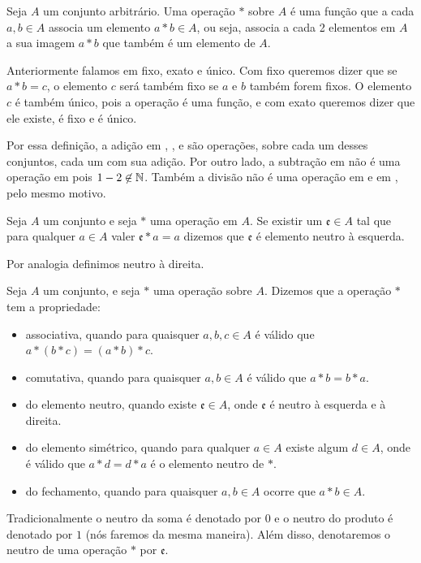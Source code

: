 \documentclass[../main.tex]{subfiles}
\begin{document}
\begin{defi}\label{agb-def-operacao}
    Seja $A$ um conjunto arbitrário. Uma operação $*$ sobre $A$ é uma função que a cada $a,b \in A$ associa um elemento $a * b \in A$, ou seja, associa a cada 2 elementos em $A$ a sua imagem $a * b$ que também é um elemento de $A$.
\end{defi}

\begin{obs}\label{agb-obs-operacao}
    Anteriormente falamos em fixo, exato e único. Com fixo queremos dizer que se $a*b = c$, o elemento $c$ será também fixo se $a$ e $b$ também forem fixos. O elemento $c$ é também único, pois a operação é uma função, e com exato queremos dizer que ele existe, é fixo e é único. 
\end{obs}

Por essa definição, a adição em \N, \Z, \Q e \R são operações, sobre cada um desses conjuntos, cada um com sua adição. Por outro lado, a subtração em \N não é uma operação em \N pois $1-2 \not \in \mathbb{N}$. Também a divisão não é uma operação em \N e em \Z, pelo mesmo motivo.

\begin{defi}
    Seja $A$ um conjunto e seja $*$ uma operação em $A$. Se existir um $\mathfrak{e} \in A$ tal que para qualquer $a \in A$ valer $\mathfrak{e} * a = a$ dizemos que $\mathfrak{e}$ é elemento neutro à esquerda.
\end{defi}
Por analogia definimos neutro à direita.

\begin{defi}\label{agb-def-propriedades}
    Seja $A$ um conjunto, e seja $*$ uma operação sobre $A$. Dizemos que a operação $*$ tem a propriedade:
    \begin{itemize}
        \item associativa, quando para quaisquer $a,b,c \in A$ é válido que $ a * ( b * c ) = ( a * b ) * c$.
        \item comutativa, quando para quaisquer $a,b \in A$ é válido que $a * b = b * a$.
        \item do elemento neutro, quando existe $\mathfrak{e} \in A$, onde $\mathfrak{e}$ é neutro à esquerda e à direita.
        \item do elemento simétrico, quando para qualquer $a \in A$ existe algum $d \in A$, onde é válido que $a * d = d * a$ é o elemento neutro de $*$.
        \item do fechamento, quando para quaisquer $a, b \in A$ ocorre que $a * b \in A$.   
    \end{itemize}
\end{defi}
Tradicionalmente o neutro da soma é denotado por $0$ e o neutro do produto é denotado por $1$ (nós faremos da mesma maneira). Além disso, denotaremos o neutro de uma operação $*$ por $\mathfrak{e}$.
\end{document}
